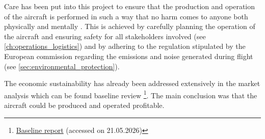 Care has been put into this project to ensure that the production and operation of the aircraft is performed in such a way that no harm comes to anyone both physically and mentally . This is achieved by carefully planning the operation of the aircraft and ensuring safety for all stakeholders involved  (see \autoref{ch:operations_logistics}) and by adhering to the regulation stipulated by the European commission regarding the emissions and noise generated during  flight (see \autoref{sec:environmental_protection}).

The economic sustainability has already been addressed extensively in the market analysis which can be found baseline review \footnote{\href{https://github.com/Teo-Cokonaj/DSE-28/blob/69f6be413226097e159b625daca4ce6815c40671/docs/Projects/DSE_Group_28_Baseline_Report.pdf}{Baseline report} (accessed on 21.05.2026)}. The main conclusion was that the aircraft could be produced and operated profitable.
